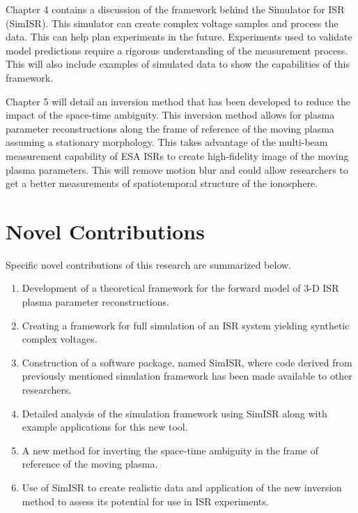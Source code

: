 Chapter 4 contains a discussion of the framework behind the Simulator for ISR (SimISR). This simulator can create complex voltage samples and process the data. This can help plan experiments in the future. Experiments used to validate model predictions require a rigorous understanding of the measurement process. This will also include examples of simulated data to show the capabilities of this framework.

Chapter 5 will detail an inversion method that has been developed to reduce the impact of the space-time ambiguity. This inversion method allows for plasma parameter reconstructions along the frame of reference of the moving plasma assuming a stationary morphology. This takes advantage of the multi-beam measurement capability of ESA ISRs to create high-fidelity image of the moving plasma parameters. This will remove motion blur and could allow researchers to get a better measurements of spatiotemporal structure of the ionosphere. 

\section{Novel Contributions}
Specific novel contributions of this research are summarized below.

\begin{enumerate}
\item Development of a theoretical framework for the forward model of 3-D ISR plasma parameter reconstructions.
\item Creating a framework for full simulation of an ISR system yielding synthetic complex voltages.
\item Construction of a software package, named SimISR, where code derived from previously mentioned simulation framework has been made available to other researchers.
\item Detailed analysis of the simulation framework using SimISR along with example applications for this new tool.
\item A new method for inverting the space-time ambiguity in the frame of reference of the moving plasma.
\item Use of SimISR to create realistic data and application of the new inversion method to assess its potential for use in ISR experiments.
\end{enumerate}